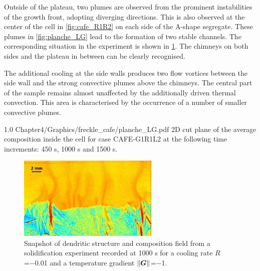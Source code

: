 Outside of the plateau, two plumes are observed from the prominent instabilities of the growth front, adopting diverging directions. 
This is also observed at the center of the cell in \cref{fig:cafe_R1R2} on each side of the A-shape segregate. 
These plumes in \cref{fig:planche_LG} lead to the formation of two stable channels. 
The corresponding situation in the experiment is shown in \cref{fig:exp_G1R1}. The chimneys on both sides and the plateau in between can be clearly 
recognised. 

The additional cooling at the side walls produces two flow vortices between the side wall and the strong convective plumes above the 
chimneys. The central part of the sample remains almost unaffected by the additionally driven thermal convection. This area is characterised by 
the occurrence of a number of smaller convective plumes.  

\begin{figureth}
{1.0}
{Chapter4/Graphics/freckle_cafe/planche_LG.pdf}
{2D cut plane of the average composition inside the cell for case CAFE-G1R1L2 at the 
following time increments: 450 s, 1000 s and 1500 s.}
\label{fig:planche_LG}
\end{figureth}

\begin{figure}[htbp]
\centering
\includegraphics[width=0.6\textwidth]{Chapter4/Graphics/freckle_exp/exp_G1R1.png}
\captionsetup{singlelinecheck=off}
\caption[.]{Snapshot of dendritic structure and composition field from a 
solidification experiment recorded at 1000 s for a cooling rate $R$=\SI{-0.01}{\uCR} and a temperature gradient $\lVert \boldsymbol{G} \rVert$=\SI{-1}{\ugradT}.}
\label{fig:exp_G1R1}
\end{figure}





